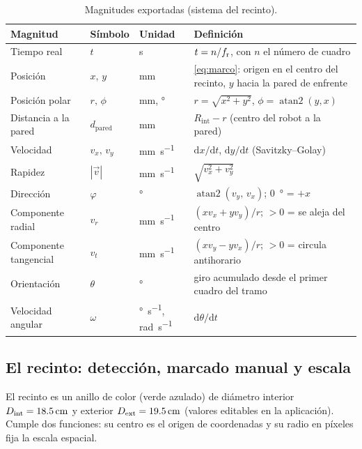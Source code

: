 \begin{table}[H]
  \centering
  \caption{Magnitudes exportadas (sistema del recinto).}
  \label{tab:magnitudes}
  \small
  \begin{tabular}{@{}llll@{}}
    \toprule
    Magnitud & Símbolo & Unidad & Definición \\
    \midrule
    Tiempo real & $t$ & \si{\second} & $t = n/f_{\mathrm{r}}$, con $n$ el número de cuadro \\
    Posición & $x,\,y$ & \si{\milli\metre} & \cref{eq:marco}: origen en el centro del recinto, $y$ hacia la pared de enfrente \\
    Posición polar & $r,\,\phi$ & \si{\milli\metre}, \si{\degree} & $r=\sqrt{x^2+y^2}$, $\phi=\operatorname{atan2}(y,x)$ \\
    Distancia a la pared & $d_{\mathrm{pared}}$ & \si{\milli\metre} & $R_{\mathrm{int}} - r$ (centro del robot a la pared) \\
    Velocidad & $v_x,\,v_y$ & \si{\milli\metre\per\second} & $\mathrm{d}x/\mathrm{d}t$, $\mathrm{d}y/\mathrm{d}t$ (Savitzky--Golay) \\
    Rapidez & $|\vec v|$ & \si{\milli\metre\per\second} & $\sqrt{v_x^2+v_y^2}$ \\
    Dirección & $\varphi$ & \si{\degree} & $\operatorname{atan2}(v_y,\,v_x)$; \SI{0}{\degree} = $+x$ \\
    Componente radial & $v_r$ & \si{\milli\metre\per\second} & $(x v_x + y v_y)/r$; $>0$ = se aleja del centro \\
    Componente tangencial & $v_t$ & \si{\milli\metre\per\second} & $(x v_y - y v_x)/r$; $>0$ = circula antihorario \\
    Orientación & $\theta$ & \si{\degree} & giro acumulado desde el primer cuadro del tramo \\
    Velocidad angular & $\omega$ & \si{\degree\per\second}, \si{\radian\per\second} & $\mathrm{d}\theta/\mathrm{d}t$ \\
    \bottomrule
  \end{tabular}
\end{table}

\subsection{El recinto: detección, marcado manual y escala}\label{sec:recinto}

El recinto es un anillo de color (verde azulado) de diámetro interior
$D_{\mathrm{int}} = \SI{18.5}{\centi\metre}$ y exterior
$D_{\mathrm{ext}} = \SI{19.5}{\centi\metre}$ (valores editables en la aplicación).
Cumple dos funciones: su centro es el origen de coordenadas y su radio en píxeles fija la escala
espacial.

